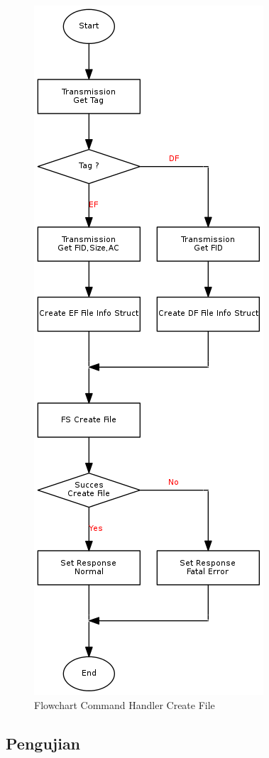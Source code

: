 \begin{figure}[h]
\centering
\includegraphics[height=0.6\textheight]{image/command/flow_cmdcreate.png}
\caption{Flowchart Command Handler Create File}
\label{fig-flow-cmdcreate}
\end{figure}

\subsection {Pengujian}

